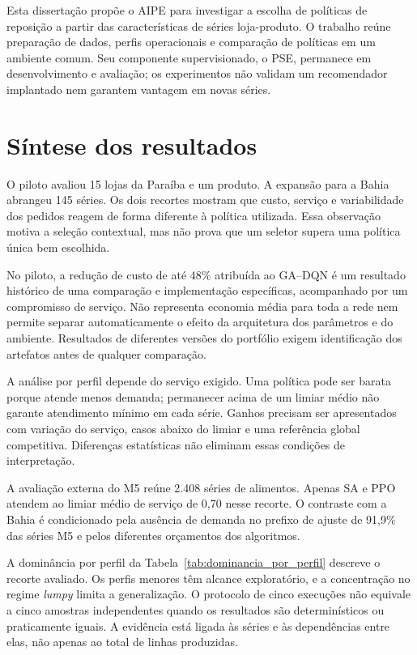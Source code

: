 
Esta dissertação propõe o AIPE para investigar a escolha de políticas de reposição a partir das características de séries loja-produto. O trabalho reúne preparação de dados, perfis operacionais e comparação de políticas em um ambiente comum. Seu componente supervisionado, o PSE, permanece em desenvolvimento e avaliação; os experimentos não validam um recomendador implantado nem garantem vantagem em novas séries.

\section{Síntese dos resultados}

O piloto avaliou 15 lojas da Paraíba e um produto. A expansão para a Bahia abrangeu 145 séries. Os dois recortes mostram que custo, serviço e variabilidade dos pedidos reagem de forma diferente à política utilizada. Essa observação motiva a seleção contextual, mas não prova que um seletor supera uma política única bem escolhida.

No piloto, a redução de custo de até 48\% atribuída ao GA--DQN é um resultado histórico de uma comparação e implementação específicas, acompanhado por um compromisso de serviço. Não representa economia média para toda a rede nem permite separar automaticamente o efeito da arquitetura dos parâmetros e do ambiente. Resultados de diferentes versões do portfólio exigem identificação dos artefatos antes de qualquer comparação.

A análise por perfil depende do serviço exigido. Uma política pode ser barata porque atende menos demanda; permanecer acima de um limiar médio não garante atendimento mínimo em cada série. Ganhos precisam ser apresentados com variação do serviço, casos abaixo do limiar e uma referência global competitiva. Diferenças estatísticas não eliminam essas condições de interpretação.

A avaliação externa do M5 reúne 2.408 séries de alimentos. Apenas SA e PPO atendem ao limiar médio de serviço de 0,70 nesse recorte. O contraste com a Bahia é condicionado pela ausência de demanda no prefixo de ajuste de 91,9\% das séries M5 e pelos diferentes orçamentos dos algoritmos.

A dominância por perfil da Tabela~\ref{tab:dominancia_por_perfil} descreve o recorte avaliado. Os perfis menores têm alcance exploratório, e a concentração no regime \textit{lumpy} limita a generalização. O protocolo de cinco execuções não equivale a cinco amostras independentes quando os resultados são determinísticos ou praticamente iguais. A evidência está ligada às séries e às dependências entre elas, não apenas ao total de linhas produzidas.

